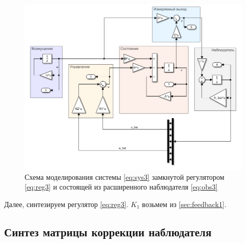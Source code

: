 \begin{figure}[H]
    \centering
    \includegraphics[width=\linewidth]{figs/task3_slx.png}
    \caption{Схема моделирования системы \eqref{eq:sys3}
    замкнутой регулятором \eqref{eq:reg3} и состоящей
    из расширенного наблюдателя \eqref{eq:obs3}}
    \label{fig:sys3}
\end{figure}
Далее, синтезируем регулятор \eqref{eq:reg3}. $K_1$ возьмем из \autoref{sec:feedback1}.


\subsection{Синтез матрицы коррекции наблюдателя}

